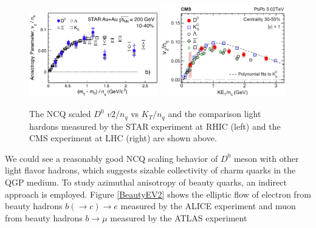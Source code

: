 \begin{figure}[hbtp]
\begin{center}
\includegraphics[width=0.50\textwidth]{Figures/Chapter2/STARv2.png}
\includegraphics[width=0.485\textwidth]{Figures/Chapter2/CMSv2.png}
\caption{The NCQ scaled $D^0$ $v2/n_q$ vs $K_T/n_q$ and the comparison light hardons measured by the STAR experiment at RHIC (left) and the CMS experiment at LHC (right) are shown above.}
\label{HQV2}
\end{center}
\end{figure}   

We could see a reasonably good NCQ scaling behavior of $D^0$ meson with other light flavor hadrons, which suggests sizable collectivity of charm quarks in the QGP medium. To study azimuthal anisotropy of beauty quarks, an indirect approach is employed. Figure \ref{BeautyEV2} shows the elliptic flow of electron from beauty hadrons $b (\rightarrow c) \rightarrow e$ measured by the ALICE experiment \cite{ALICENPElec} and muon from beauty hadrons $b \rightarrow \mu$ measured by the ATLAS experiment \cite{ATLASNPMuon}


